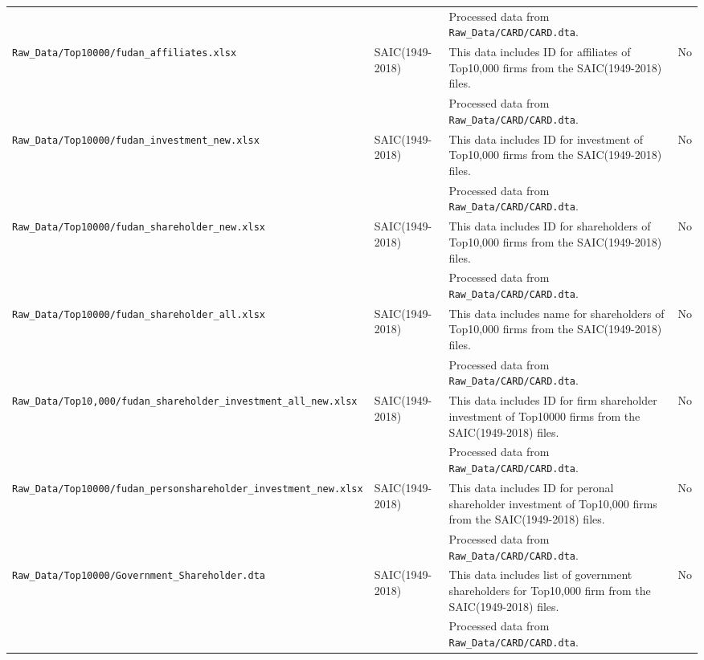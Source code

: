 \documentclass[12pt,notitlepage]{article}
\begin{document}
\begin{landscape}
\begin{table}[htbp]
{\begin{tabular}{llll}
		&& Processed data from \texttt{Raw\_Data/CARD/CARD.dta}. \\
\texttt{Raw\_Data/Top10000/fudan\_affiliates.xlsx} & SAIC(1949-2018) & This data includes ID for affiliates of Top10,000 firms from the SAIC(1949-2018) files. & No \\
		&& Processed data from \texttt{Raw\_Data/CARD/CARD.dta}. \\	
\texttt{Raw\_Data/Top10000/fudan\_investment\_new.xlsx} & SAIC(1949-2018) & This data includes ID for investment of Top10,000 firms from the SAIC(1949-2018) files. & No \\
		&& Processed data from \texttt{Raw\_Data/CARD/CARD.dta}. \\
\texttt{Raw\_Data/Top10000/fudan\_shareholder\_new.xlsx} & SAIC(1949-2018) & This data includes ID for shareholders of Top10,000 firms from the SAIC(1949-2018) files. & No \\
		&& Processed data from \texttt{Raw\_Data/CARD/CARD.dta}. \\
\texttt{Raw\_Data/Top10000/fudan\_shareholder\_all.xlsx} & SAIC(1949-2018) & This data includes name for shareholders of Top10,000 firms from the SAIC(1949-2018) files. & No \\
		&& Processed data from \texttt{Raw\_Data/CARD/CARD.dta}. \\
\texttt{Raw\_Data/Top10,000/fudan\_shareholder\_investment\_all\_new.xlsx} & SAIC(1949-2018) & This data includes ID for firm shareholder investment of Top10000 firms from the SAIC(1949-2018) files. & No \\
		&& Processed data from \texttt{Raw\_Data/CARD/CARD.dta}. \\
\texttt{Raw\_Data/Top10000/fudan\_personshareholder\_investment\_new.xlsx} & SAIC(1949-2018) & This data includes ID for peronal shareholder investment of Top10,000 firms from the SAIC(1949-2018) files. & No \\
		&& Processed data from \texttt{Raw\_Data/CARD/CARD.dta}. \\
\texttt{Raw\_Data/Top10000/Government\_Shareholder.dta} & SAIC(1949-2018) & This data includes list of government shareholders for Top10,000 firm from the SAIC(1949-2018) files. & No \\
		&& Processed data from \texttt{Raw\_Data/CARD/CARD.dta}. \\
		\bottomrule
	\end{tabular}}
\end{table}
\end{landscape}
\end{document}
